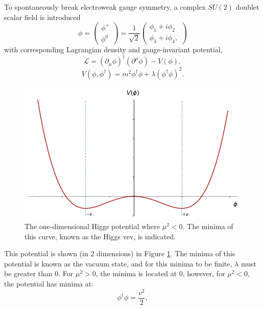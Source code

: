 To spontaneously break electroweak gauge symmetry, a complex $SU(2)$ doublet scalar field is introduced
\begin{equation}
\phi = \begin{pmatrix} \phi^+ \\ \phi^0 \end{pmatrix}
    = \frac{1}{\sqrt{2}}\begin{pmatrix}
        \phi_1 + i\phi_2 \\ \phi_3 + i\phi_4,
    \end{pmatrix}
\end{equation}
%
with corresponding Lagrangian density and gauge-invariant potential,
\begin{equation}
    \mathcal{L} = (\partial_{\mu}\phi)^\dagger (\partial^{\mu}\phi) - V(\phi),
\end{equation}
\begin{equation}
    V(\phi,\phi^\dagger) = m^2 \phi^\dagger \phi + \lambda (\phi^\dagger \phi)^2.
\end{equation}
%
\begin{figure}[!ht]
    \centering
    \includegraphics[width=\textwidth]{chapters/chapter1_theory/images/higgs-2d-vev.png}
    \caption[The one-dimensional Higgs potential where $\mu^2 <0$]{The one-dimensional Higgs potential where $\mu^2 <0$. The minima of this curve, known as the Higgs \gls{vev}, is indicated.}
    \label{fig:higgs-potential}
\end{figure}
%
This potential is shown (in 2 dimensions) in Figure \ref{fig:higgs-potential}. The minima of this potential is known as the vacuum state, and for this minima to be finite, $\lambda$ must be greater than 0. For $\mu^2 >0$, the minima is located at 0, however, for $\mu^2<0$, the potential has minima at:
%
\begin{equation}
    \phi^\dagger \phi = \frac{v^2}{2},
\end{equation}
